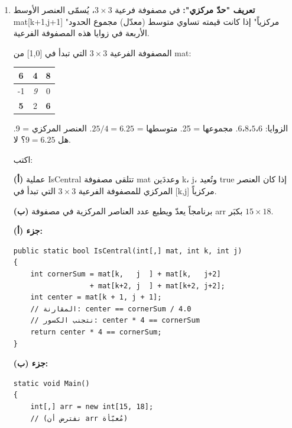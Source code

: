 \documentclass[14pt]{extarticle}
\begin{document}
\begin{enumerate}[itemsep=2em]
\clearpage
\item
\textbf{تعريف "حدّ مركزي":} في مصفوفة فرعية $3\times3$، يُسمّى العنصر الأوسط \textenglish{mat[k+1,j+1]} "مركزياً" إذا كانت قيمته تساوي متوسط (معدّل) مجموع الحدود الأربعة في زوايا هذه المصفوفة الفرعية.

\begin{boxExample}
المصفوفة الفرعية $3\times3$ التي تبدأ في \textenglish{[1,0]} من \textenglish{mat}:
\begin{center}
\begin{english}
\begin{tabular}{|c|c|c|}
\hline
\textbf{6} & 4 & \textbf{8} \\
\hline
-1 & \textit{9} & 0 \\
\hline
\textbf{5} & 2 & \textbf{6} \\
\hline
\end{tabular}
\end{english}
\end{center}
الزوايا: $6، 8، 5، 6$. مجموعها = 25. متوسطها = $25/4 = 6.25$.
العنصر المركزي = 9. هل $9 = 6.25$؟ لا.
\end{boxExample}

اكتب:

\textbf{(أ)} عملية \textenglish{IsCentral} تتلقى مصفوفة \textenglish{mat} وعددَين \textenglish{k}، \textenglish{j}، وتُعيد \textenglish{true} إذا كان العنصر المركزي للمصفوفة الفرعية $3\times3$ التي تبدأ في \textenglish{[k,j]} مركزياً.

\textbf{(ب)} برنامجاً يعدّ ويطبع عدد العناصر المركزية في مصفوفة \textenglish{arr} بكبَر $15\times18$.

\ifwithsols
\begin{boxSolution}
\textbf{جزء (أ):}
\begin{boxCode}
\begin{english}
\begin{verbatim}
public static bool IsCentral(int[,] mat, int k, int j)
{
    int cornerSum = mat[k,   j  ] + mat[k,   j+2]
                  + mat[k+2, j  ] + mat[k+2, j+2];
    int center = mat[k + 1, j + 1];
    // المقارنة: center == cornerSum / 4.0
    // نتجنب الكسور: center * 4 == cornerSum
    return center * 4 == cornerSum;
}
\end{verbatim}
\end{english}
\end{boxCode}

\textbf{جزء (ب):}
\begin{boxCode}
\begin{english}
\begin{verbatim}
static void Main()
{
    int[,] arr = new int[15, 18];
    // (نفترض أن arr مُعبّأة)


\end{verbatim}
\end{english}
\end{boxCode}
\end{boxSolution}
\end{enumerate}
\end{document}
